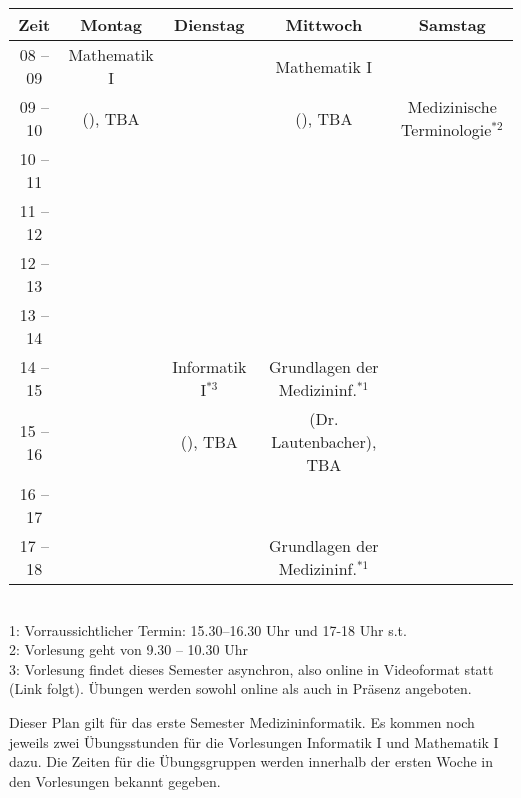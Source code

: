 \begin{minipage}{\textwidth}
    \footnotesize
\begin{center}
\begin{tabular}{|c|c|c|c|c|} 
	\hline
	Zeit    & Montag       & Dienstag             & Mittwoch                          & Samstag                           \\ 
	\hline\hline
	08 – 09 & Mathematik I &                      & Mathematik I                      &                                   \\ 
	\cline{1-1}\cline{3-3}\cline{5-5}
	09 – 10 & (), TBA      &                      & (), TBA                           & Medizinische Terminologie$^{*2}$  \\ 
	\hline
	10 – 11 &              &                      &                                   &                                   \\ 
	\cline{1-1}\cline{3-5}
	11 – 12 &              &                      &                                   &                                   \\ 
	\hline
	12 – 13 &              &                      &                                   &                                   \\ 
	\hline
	13 – 14 &              &                      &                                   &                                   \\ 
	\hline
	14 – 15 &              & Informatik I$^{*3}$  & Grundlagen der Medizininf.$^{*1}$ &                                   \\ 
	\cline{1-2}\cline{4-5}
	15 – 16 &              & (), TBA              & (Dr. Lautenbacher), TBA           &                                   \\ 
	\cline{1-3}\cline{5-5}
	16 – 17 &              &                      &                                   &                                   \\ 
	\hline
	17 – 18 &              &                      & Grundlagen der Medizininf.$^{*1}$ &                                   \\
	\hline
\end{tabular}
    ~\\
\scriptsize %
1: Vorraussichtlicher Termin: 15.30--16.30 Uhr und 17-18 Uhr s.t.\\
2: Vorlesung geht von 9.30 -- 10.30 Uhr\\
3: Vorlesung findet dieses Semester asynchron, also online in Videoformat statt (Link folgt). Übungen werden sowohl online als auch in Präsenz angeboten.
\end{center}
\end{minipage}
Dieser Plan gilt für das erste Semester Medizininformatik. Es kommen noch jeweils zwei Übungsstunden für die Vorlesungen 
Informatik I und Mathematik I dazu. Die Zeiten für die Übungsgruppen werden innerhalb der ersten Woche in den Vorlesungen bekannt gegeben.
